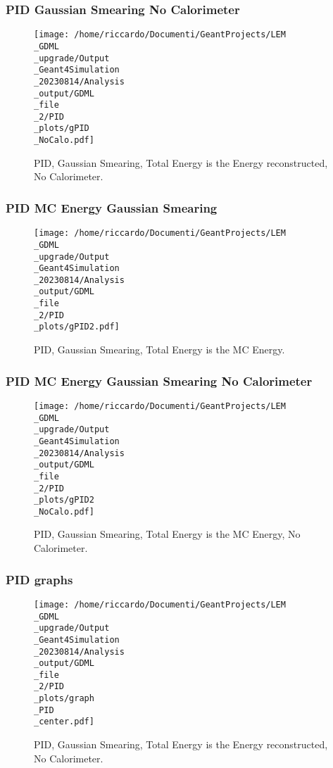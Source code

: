 \documentclass[8pt]{beamer}
\begin{document}
            \begin{frame}
                \frametitle{PID Gaussian Smearing No Calorimeter}
            
        \begin{figure}[h]
            \centering
            \texttt{[image: /home/riccardo/Documenti/GeantProjects/LEM\\\_GDML\\\_upgrade/Output\\\_Geant4Simulation\\\_20230814/Analysis\\\_output/GDML\\\_file\\\_2/PID\\\_plots/gPID\\\_NoCalo.pdf]}
            \caption{PID, Gaussian Smearing, Total Energy is the Energy reconstructed, No Calorimeter.}
        \end{figure}
        
            \end{frame}
            
            \begin{frame}
                \frametitle{PID MC Energy Gaussian Smearing}
            
        \begin{figure}[h]
            \centering
            \texttt{[image: /home/riccardo/Documenti/GeantProjects/LEM\\\_GDML\\\_upgrade/Output\\\_Geant4Simulation\\\_20230814/Analysis\\\_output/GDML\\\_file\\\_2/PID\\\_plots/gPID2.pdf]}
            \caption{PID, Gaussian Smearing, Total Energy is the MC Energy.}
        \end{figure}
        
            \end{frame}
            
            \begin{frame}
                \frametitle{PID MC Energy Gaussian Smearing No Calorimeter}
            
        \begin{figure}[h]
            \centering
            \texttt{[image: /home/riccardo/Documenti/GeantProjects/LEM\\\_GDML\\\_upgrade/Output\\\_Geant4Simulation\\\_20230814/Analysis\\\_output/GDML\\\_file\\\_2/PID\\\_plots/gPID2\\\_NoCalo.pdf]}
            \caption{PID, Gaussian Smearing, Total Energy is the MC Energy, No Calorimeter.}
        \end{figure}
        
            \end{frame}
            
            \begin{frame}
                \frametitle{PID graphs}
            
        \begin{figure}[h]
            \centering
            \texttt{[image: /home/riccardo/Documenti/GeantProjects/LEM\\\_GDML\\\_upgrade/Output\\\_Geant4Simulation\\\_20230814/Analysis\\\_output/GDML\\\_file\\\_2/PID\\\_plots/graph\\\_PID\\\_center.pdf]}
            \caption{PID, Gaussian Smearing, Total Energy is the Energy reconstructed, No Calorimeter.}
        \end{figure}
        
            \end{frame}
            
\end{document}
